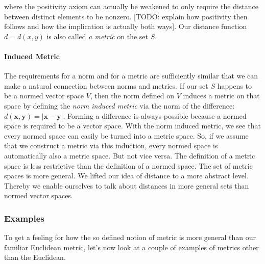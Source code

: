 where the positivity axiom can actually be weakened to only require the distance between distinct elements to be nonzero. [TODO: explain how positivity then follows and how the implication is actually both ways]. Our distance function $d = d(x,y)$ is also called \emph{a metric} on the set $S$. 





\paragraph{Induced Metric}
The requirements for a norm and for a metric are sufficiently similar that we can make a natural connection between norms and metrics. If our set $S$ happens to be a normed vector space $V$, then the norm defined on $V$ induces a metric on that space by defining the \emph{norm induced metric} via the norm of the difference: $d(\mathbf{x, y}) = |\mathbf{x-y}|$. Forming a difference is always possible because a normed space is required to be a vector space. With the norm induced metric, we see that every normed space can easily be turned into a metric space. So, if we assume that we construct a metric via this induction, every normed space is automatically also a metric space. But not vice versa. The definition of a metric space is less restrictive than the definition of a normed space. The set of metric spaces is more general. We lifted our idea of distance to a more abstract level. Thereby we enable ourselves to talk about distances in more general sets than normed vector spaces.

\medskip
[Q: Can we turn this around by saying that a metric induces a norm by defining the norm as distance from the origin $|\mathbf{x}| = d (\mathbf{x, 0})$ whenever our set happens to have some special element $\mathbf{0}$ that we call the origin?]

\subsubsection{Examples} To get a feeling for how the so defined notion of metric is more general than our familiar Euclidean metric, let's now look at a couple of examples of metrics other than the Euclidean. 

